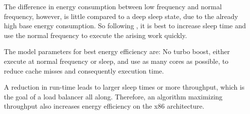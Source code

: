 The difference in energy consumption between low frequency and normal
frequency, however, is little compared to a deep sleep state, due to the
already high base energy consumption.
So following \cite{imes_poet_2015}, it is best to increase sleep time and use
the normal frequency to execute the arising work quickly.

The model parameters for best energy efficiency are:
No turbo boost, either execute at normal frequency or sleep, and use as many
cores as possible, to reduce cache misses and consequently execution time.

A reduction in run-time leads to larger sleep times or more throughput, which is
the goal of a load balancer all along.
Therefore, an algorithm maximizing throughput also increases energy efficiency
on the x86 architecture.


